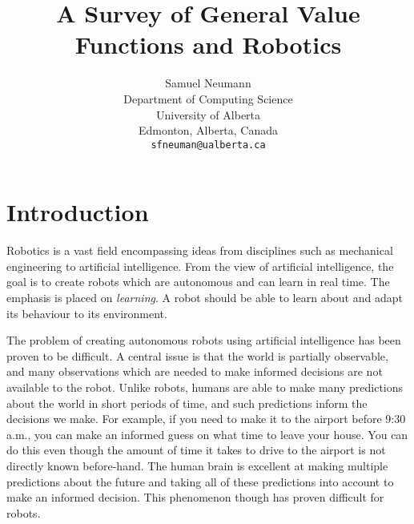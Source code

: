 \documentclass{article} %
\title{A Survey of General Value Functions and Robotics}
\author{Samuel Neumann \\ %
Department of Computing Science\\
University of Alberta\\
Edmonton, Alberta, Canada \\
\texttt{sfneuman@ualberta.ca} \\
}
\theoremstyle{plain}
\theoremstyle{definition}
\theoremstyle{remark}
\begin{document}
\maketitle


\section{Introduction}%
\label{sec:introduction}




Robotics is a vast field encompassing ideas from disciplines such as mechanical engineering to artificial intelligence.
From the view of artificial intelligence, the goal is to create robots which are autonomous and can learn in real
time. The emphasis is placed on \textit{learning}. A robot should be able to learn about and adapt its behaviour to
its environment.

The problem of creating autonomous robots using artificial intelligence has been proven to be difficult. A central issue
is that the world is partially observable, and many observations which are needed to make informed decisions are not
available to the robot. Unlike robots, humans are able to make many predictions about the world in short periods of
time, and such predictions inform the decisions we make. For example, if you need to make it to the airport before 9:30
a.m., you can make an informed guess on what time to leave your house. You can do this even though the amount of time it
takes to drive to the airport is not directly known before-hand. The human brain is excellent at making multiple
predictions about the future and taking all of these predictions into account to make an informed decision. This
phenomenon though has proven difficult for robots.
\end{document}
